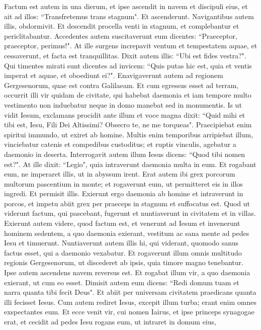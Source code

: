\begin{biblechapter}
\verse Factum est autem in una dierum, et ipse ascendit in navem et discipuli eius, et ait ad illos: “Transfretemus trans stagnum". Et ascenderunt. 
\verse Navigantibus autem illis, obdormivit. Et descendit procella venti in stagnum, et complebantur et periclitabantur. 
\verse Accedentes autem suscitaverunt eum dicentes: “Praeceptor, praeceptor, perimus!". At ille surgens increpavit ventum et tempestatem aquae, et cessaverunt, et facta est tranquillitas. 
\verse Dixit autem illis: “Ubi est fides vestra?". Qui timentes mirati sunt dicentes ad invicem: “Quis putas hic est, quia et ventis imperat et aquae, et oboediunt ei?". 
\verse Enavigaverunt autem ad regionem Gergesenorum, quae est contra Galilaeam.  
\verse Et cum egressus esset ad terram, occurrit illi vir quidam de civitate, qui habebat daemonia et iam tempore multo vestimento non induebatur neque in domo manebat sed in monumentis. 
\verse Is ut vidit Iesum, exclamans procidit ante illum et voce magna dixit: “Quid mihi et tibi est, Iesu, Fili Dei Altissimi? Obsecro te, ne me torqueas". 
\verse Praecipiebat enim spiritui immundo, ut exiret ab homine. Multis enim temporibus arripiebat illum, vinciebatur catenis et compedibus custoditus; et ruptis vinculis, agebatur a daemonio in deserta.  
\verse Interrogavit autem illum Iesus dicens: “Quod tibi nomen est?". At ille dixit: “Legio", quia intraverunt daemonia multa in eum. 
\verse Et rogabant eum, ne imperaret illis, ut in abyssum irent. 
\verse Erat autem ibi grex porcorum multorum pascentium in monte; et rogaverunt eum, ut permitteret eis in illos ingredi. Et permisit illis. 
\verse Exierunt ergo daemonia ab homine et intraverunt in porcos, et impetu abiit grex per praeceps in stagnum et suffocatus est. 
\verse Quod ut viderunt factum, qui pascebant, fugerunt et nuntiaverunt in civitatem et in villas. 
\verse Exierunt autem videre, quod factum est, et venerunt ad Iesum et invenerunt hominem sedentem, a quo daemonia exierant, vestitum ac sana mente ad pedes Iesu et timuerunt. 
\verse Nuntiaverunt autem illis hi, qui viderant, quomodo sanus factus esset, qui a daemonio vexabatur. 
\verse Et rogaverunt illum omnis multitudo regionis Gergesenorum, ut discederet ab ipsis, quia timore magno tenebantur. Ipse autem ascendens navem reversus est. 
\verse Et rogabat illum vir, a quo daemonia exierant, ut cum eo esset. Dimisit autem eum dicens: 
\verse “Redi domum tuam et narra quanta tibi fecit Deus". Et abiit per universam civitatem praedicans quanta illi fecisset Iesus. 
\verse Cum autem rediret Iesus, excepit illum turba; erant enim omnes exspectantes eum. 
\verse Et ecce venit vir, cui nomen Iairus, et ipse princeps synagogae erat, et cecidit ad pedes Iesu rogans eum, ut intraret in domum eius, 

\end{biblechapter}

